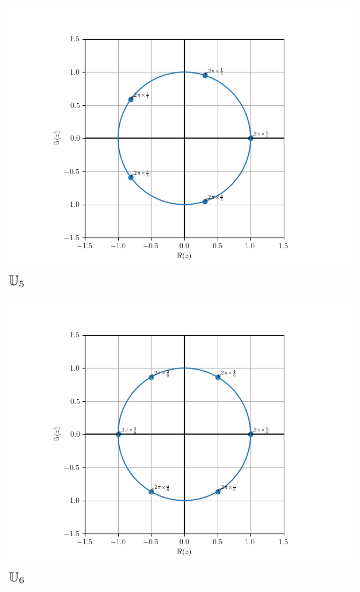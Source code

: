 \begin{figure}
\begin{subfigure}{.3\textwidth}
        \label{fig:U4}      
    \end{subfigure}
    \begin{subfigure}{.3\textwidth}
        \centering
        \includegraphics[scale=.33]{U_5.png}  
        \caption{$\mathbb{U}_5$}
        \label{fig:U5}      
    \end{subfigure}
    \newline
    \begin{subfigure}{.3\textwidth}
        \centering
        \includegraphics[scale=.33]{U_6.png}  
        \caption{$\mathbb{U}_6$}
        \label{fig:U6}      
    \end{subfigure}
    \begin{subfigure}{.3\textwidth}

\end{subfigure}
\end{figure}
